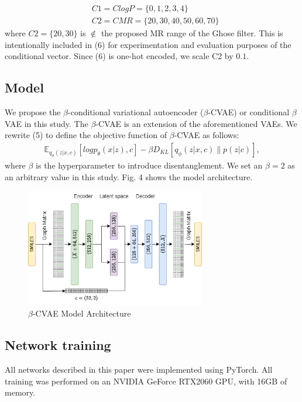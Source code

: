 \begin{equation}
    \begin{aligned}
    & C1 = ClogP = \{0, 1, 2, 3, 4 \}\\
    & C2 = CMR  =\{20, 30, 40, 50, 60, 70\} \label{eq}
    \end{aligned}
\end{equation}
where $C2 = \{20, 30\}$ is $\notin$ the proposed MR range of the Ghose filter. This is intentionally included in (6) for experimentation and evaluation purposes of the conditional vector. Since (6) is one-hot encoded, we scale C2 by $0.1$.

\subsection{Model}
 We propose the $\beta$-conditional variational autoencoder ($\beta$-CVAE) or conditional $\beta$VAE in this study. The $\beta$-CVAE is an extension of the aforementioned VAEs. We rewrite (5) to define the objective function of $\beta$-CVAE as follows:
\begin{equation}
\begin{split}
\mathbb{E}_{q_\phi(z|x,c)}[log p_\theta(x|z),c] - \beta D_{KL}[q_\phi(z|x,c)\parallel p(z|c)],\label{eq}
\end{split}
\end{equation}
where $\beta$ is the hyperparameter to introduce disentanglement. We set an $\beta = 2$ as an arbitrary value in this study. Fig. 4 shows the model architecture.

\begin{figure}[htbp]
    \centerline{\includegraphics[width=0.7\textwidth]{fig4.png}}
    \caption{$\beta$-CVAE Model Architecture}
    \label{fig}
\end{figure}

\subsection{Network training}
All networks described in this paper were implemented using PyTorch. All training was performed on an NVIDIA GeForce RTX2060 GPU, with 16GB of memory.

